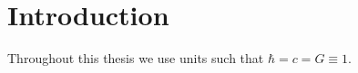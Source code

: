 \chapter{Introduction}
Throughout this thesis we use units such that $\hbar = c = G \equiv 1$. \\

\Blindtext